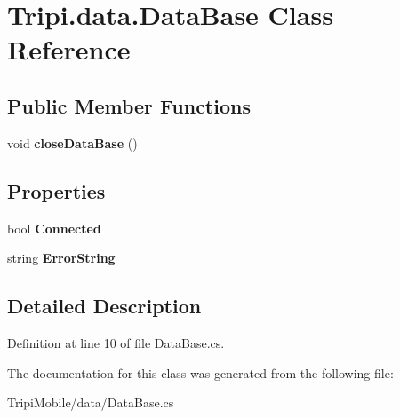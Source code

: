 \hypertarget{class_tripi_1_1data_1_1_data_base}{
\section{Tripi.data.DataBase Class Reference}
\label{class_tripi_1_1data_1_1_data_base}
}
\subsection*{Public Member Functions}
\begin{DoxyCompactItemize}
\item 
\hypertarget{class_tripi_1_1data_1_1_data_base_ac71158174e46b42b5cc7e2229364ed8d}{
void {\bfseries closeDataBase} ()}
\label{class_tripi_1_1data_1_1_data_base_ac71158174e46b42b5cc7e2229364ed8d}

\end{DoxyCompactItemize}
\subsection*{Properties}
\begin{DoxyCompactItemize}
\item 
\hypertarget{class_tripi_1_1data_1_1_data_base_a17ca0d559e0fb1bde201e9e43a336081}{
bool {\bfseries Connected}}
\label{class_tripi_1_1data_1_1_data_base_a17ca0d559e0fb1bde201e9e43a336081}

\item 
\hypertarget{class_tripi_1_1data_1_1_data_base_a868ca5d35c304b988dd72b5fb4e3e7df}{
string {\bfseries ErrorString}}
\label{class_tripi_1_1data_1_1_data_base_a868ca5d35c304b988dd72b5fb4e3e7df}

\end{DoxyCompactItemize}


\subsection{Detailed Description}


Definition at line 10 of file DataBase.cs.

The documentation for this class was generated from the following file:\begin{DoxyCompactItemize}
\item 
TripiMobile/data/DataBase.cs\end{DoxyCompactItemize}
